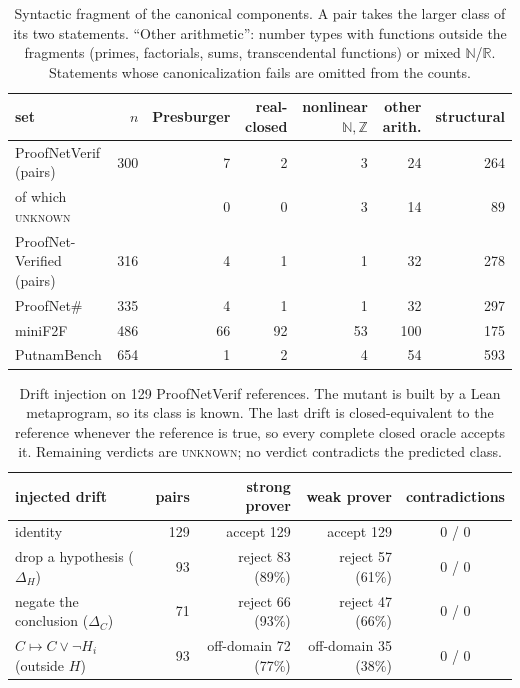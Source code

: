 \documentclass[10pt]{article}
\theoremstyle{definition}
\newcommand{\V}[1]{\textsc{#1}}
\begin{document}
\begin{table}[t]
\centering\small
\begin{tabular}{lrrrrrr}
\toprule
set & $n$ & Presburger & real-closed & nonlinear $\mathbb N,\mathbb Z$ & other arith. & structural\\
\midrule
ProofNetVerif (pairs) & 300 & 7 & 2 & 3 & 24 & 264\\
\quad of which \V{unknown} & & 0 & 0 & 3 & 14 & 89\\
ProofNet-Verified (pairs) & 316 & 4 & 1 & 1 & 32 & 278\\
ProofNet\# & 335 & 4 & 1 & 1 & 32 & 297\\
miniF2F & 486 & 66 & 92 & 53 & 100 & 175\\
PutnamBench & 654 & 1 & 2 & 4 & 54 & 593\\
\bottomrule
\end{tabular}
\caption{Syntactic fragment of the canonical components. A pair takes the larger class of
its two statements. ``Other arithmetic'': number types with functions outside the fragments
(primes, factorials, sums, transcendental functions) or mixed $\mathbb N$/$\mathbb R$.
Statements whose canonicalization fails are omitted from the counts.}
\label{tab:frag}
\end{table}

\begin{table}[t]
\centering\small
\begin{tabular}{lrrrc}
\toprule
injected drift & pairs & strong prover & weak prover & contradictions\\
\midrule
identity & 129 & accept 129 & accept 129 & 0 / 0\\
drop a hypothesis ($\Delta_H$) & 93 & reject 83 (89\%) & reject 57 (61\%) & 0 / 0\\
negate the conclusion ($\Delta_C$) & 71 & reject 66 (93\%) & reject 47 (66\%) & 0 / 0\\
$C\mapsto C\vee\neg H_i$ (outside $H$) & 93 & off-domain 72 (77\%) & off-domain 35 (38\%) & 0 / 0\\
\bottomrule
\end{tabular}
\caption{Drift injection on 129 ProofNetVerif references. The mutant is built by a Lean
metaprogram, so its class is known. The last drift is closed-equivalent to the reference whenever
the reference is true, so every complete closed oracle accepts it. Remaining verdicts are
\V{unknown}; no verdict contradicts the predicted class.}
\label{tab:g2}
\end{table}
\end{document}
